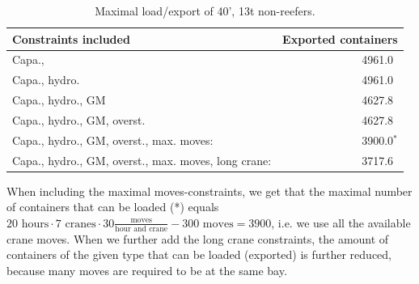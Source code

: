 \begin{table}[htbp]
\begin{small}
\begin{center}
\begin{tabular}{l|r}
Constraints included						  									&Exported containers\\
\hline
Capa., 																							&4961.0$\phantom{^{*}}$\\
Capa., hydro. 																			&4961.0$\phantom{^{*}}$\\
Capa., hydro., GM																		&4627.8$\phantom{^{*}}$\\
Capa., hydro., GM, overst.													&4627.8$\phantom{^{*}}$\\
Capa., hydro., GM, overst., max. moves:							&3900.0$^{*}$\\ 
Capa., hydro., GM, overst., max. moves, long crane:	&3717.6$\phantom{^{*}}$\\
\end{tabular}
\caption{Maximal load/export of 40', 13t non-reefers.}\label{tab:resultsPS}
\end{center}
\end{small}
\end{table}

When including the maximal moves-constraints, we get that the maximal number of containers that can be loaded (*) equals $20\text{ hours}\cdot7\text{ cranes}\cdot 30 \frac{\text{moves}}{\text{hour and crane}} - 300 \text{ moves} = 3900$, i.e. we use all the available crane moves.  
When we further add the long crane constraints, the amount of containers of the given type that can be loaded (exported) is further reduced, because many moves are required to be at the same bay.


